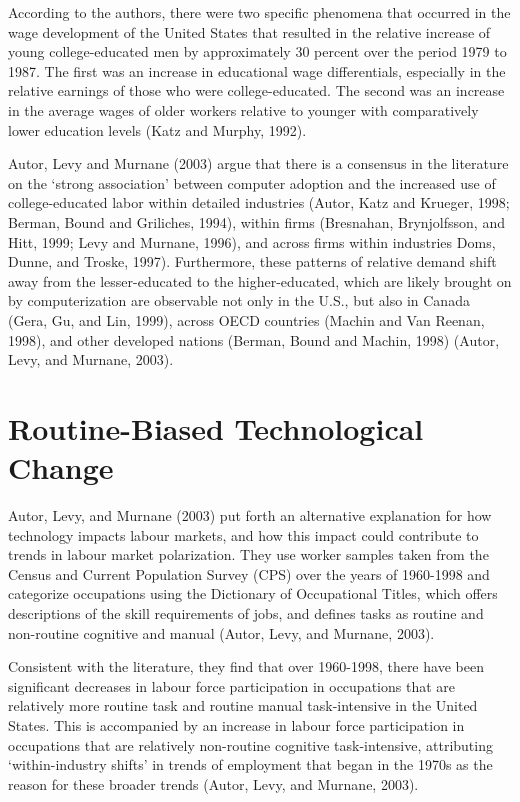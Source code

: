 \documentclass[undefended]{bumrp}
\begin{document}
According to the authors, there were two specific phenomena that occurred in the wage development of the United States that resulted in the relative increase of young college-educated men by approximately 30 percent over the period 1979 to 1987. The first was an increase in educational wage differentials, especially in the relative earnings of those who were college-educated. The second was an increase in the average wages of older workers relative to younger with comparatively lower education levels (Katz and Murphy, 1992).

Autor, Levy and Murnane (2003) argue that there is a consensus in the literature on the ‘strong association’ between computer adoption and the increased use of college-educated labor within detailed industries (Autor, Katz and Krueger, 1998; Berman, Bound and Griliches, 1994), within firms (Bresnahan, Brynjolfsson, and Hitt, 1999; Levy and Murnane, 1996), and across firms within industries Doms, Dunne, and Troske, 1997). Furthermore, these patterns of relative demand shift away from the lesser-educated to the higher-educated, which are likely brought on by computerization are observable not only in the U.S., but also in Canada (Gera, Gu, and Lin, 1999), across OECD countries (Machin and Van Reenan, 1998), and other developed nations (Berman, Bound and Machin, 1998) (Autor, Levy, and Murnane, 2003). 

\section{Routine-Biased Technological Change}

Autor, Levy, and Murnane (2003) put forth an alternative explanation for how technology impacts labour markets, and how this impact could contribute to trends in labour market polarization. They use worker samples taken from the Census and Current Population Survey (CPS) over the years of 1960-1998 and categorize occupations using the Dictionary of Occupational Titles, which offers descriptions of the skill requirements of jobs, and defines tasks as routine and non-routine cognitive and manual (Autor, Levy, and Murnane, 2003). 

Consistent with the literature, they find that over 1960-1998, there have been significant decreases in labour force participation in occupations that are relatively more routine task and routine manual task-intensive in the United States. This is accompanied by an increase in labour force participation in occupations that are relatively non-routine cognitive task-intensive, attributing ‘within-industry shifts’ in trends of employment that began in the 1970s as the reason for these broader trends (Autor, Levy, and Murnane, 2003).
\end{document}
